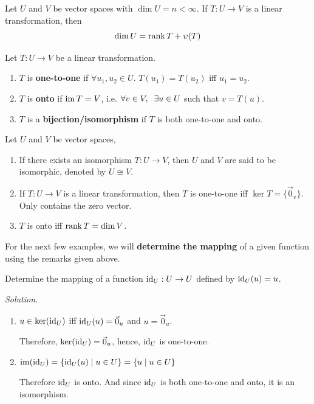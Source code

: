 \leavevmode

\begin{theorem}
Let $U$ and $V$ be vector spaces with $\dim U = n < \infty$. If $T: U \to V$ is a linear transformation, then
$$\dim U = \rank T + \upsilon(T)$$
\end{theorem}

\begin{definition}
Let $T: U \to V$ be a linear transformation.
\begin{enumerate}
    \item $T$ is \textbf{one-to-one} if $\forall u_1, u_2 \in U$. $T(u_1) = T(u_2)$ iff $u_1 = u_2$.
    \item $T$ is \textbf{onto} if $\operatorname{im} T = V$, i.e. $\forall v \in V, \hspace{0.2cm} \exists u \in U$ such that $v = T(u)$.
    \item $T$ is a \textbf{bijection/isomorphism} if $T$ is both one-to-one and onto.
\end{enumerate}
\end{definition}

\newpage
\begin{remark}
Let $U$ and $V$ be vector spaces,
\begin{enumerate}
    \item If there exists an isomorphism $T: U \to V$, then $U$ and $V$ are said to be isomorphic, denoted by $U \cong V$.
    \item If $T: U \to V$ is a linear transformation, then $T$ is one-to-one iff $\ker T = \{\vec{0}_v\}$. Only contains the zero vector.
    \item $T$ is onto iff $\rank T = \dim V$.   
\end{enumerate}
\end{remark}

\lline

For the next few examples, we will \textbf{determine the mapping} of a given function using the remarks given above.

\begin{example}
Determine the mapping of a function $\operatorname{id}_U: U \to U$ defined by $\operatorname{id}_U(u) = u$.
    
\textit{Solution.} 

\begin{enumerate}
    \item $u \in \ker(\operatorname{id}_U)$ iff $\operatorname{id}_U(u) = \vec{0}_u$ and $u = \vec{0}_u$. 
    
    Therefore, $\ker(\operatorname{id}_U) = \vec{0}_u$, hence, $\operatorname{id}_U$ is one-to-one.

    \item $\operatorname{im}(\operatorname{id}_U) = \{\operatorname{id}_U(u) \mid u \in U\} = \{u \mid u \in U\}$

    Therefore $\operatorname{id}_U$ is onto. And since $\operatorname{id}_U$ is both one-to-one and onto, it is an isomorphism.
\end{enumerate}
\end{example}

